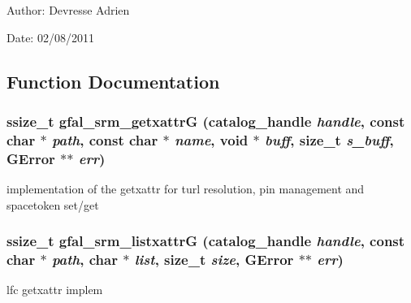 \begin{Desc}
\item[Author:]Devresse Adrien \end{Desc}
\begin{Desc}
\item[Date:]02/08/2011 \end{Desc}


\subsection{Function Documentation}
\subsubsection{\setlength{\rightskip}{0pt plus 5cm}ssize\_\-t gfal\_\-srm\_\-getxattr\-G (catalog\_\-handle {\em handle}, const char $\ast$ {\em path}, const char $\ast$ {\em name}, void $\ast$ {\em buff}, size\_\-t {\em s\_\-buff}, GError $\ast$$\ast$ {\em err})}\label{gfal__common__srm__getxattr_8c_294634c95c41aced18458de57f4de555}


implementation of the getxattr for turl resolution, pin management and spacetoken set/get 
\subsubsection{\setlength{\rightskip}{0pt plus 5cm}ssize\_\-t gfal\_\-srm\_\-listxattr\-G (catalog\_\-handle {\em handle}, const char $\ast$ {\em path}, char $\ast$ {\em list}, size\_\-t {\em size}, GError $\ast$$\ast$ {\em err})}\label{gfal__common__srm__getxattr_8c_5ed727e9131d092843d162ad577287f7}


lfc getxattr implem 